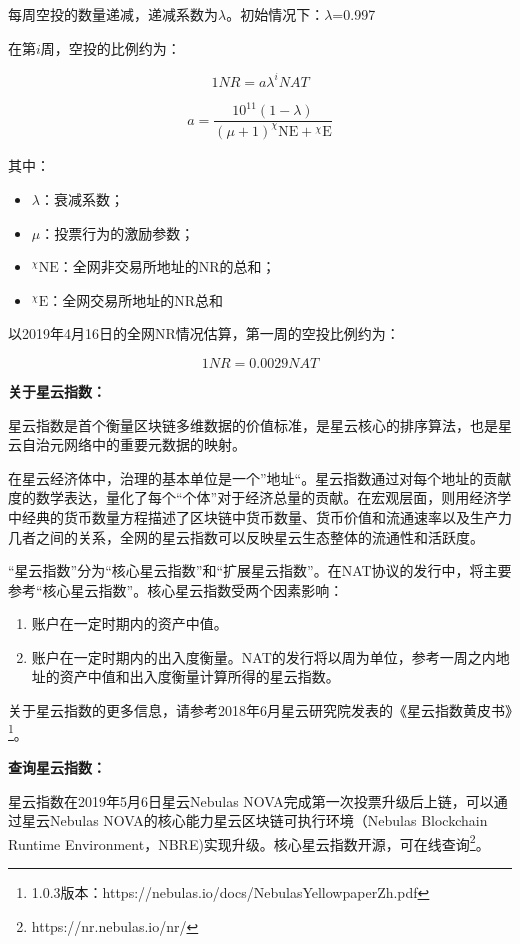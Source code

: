 每周空投的数量递减，递减系数为$\lambda$。初始情况下：$\lambda$=0.997

在第$i$周，空投的比例约为：

$$1 NR = a\lambda^{i} NAT$$

$$a=\frac{10^{11}(1-\lambda)}{{(\mu +1)_{}^{\chi}\textrm{NE}}+{_{}^{\chi}\textrm{E}}}$$    

其中：
\begin{itemize}
	\item $\lambda$：衰减系数；
	\item $\mu$：投票行为的激励参数；
	\item $_{}^{\chi}\textrm{NE}$：全网非交易所地址的NR的总和；
	\item $_{}^{\chi}\textrm{E}$：全网交易所地址的NR总和
\end{itemize}

以2019年4月16日的全网NR情况估算，第一周的空投比例约为：

$$1 NR = 0.0029 NAT$$

\textbf{关于星云指数：}
	
星云指数是首个衡量区块链多维数据的价值标准，是星云核心的排序算法，也是星云自治元网络中的重要元数据的映射。

在星云经济体中，治理的基本单位是一个”地址“。星云指数通过对每个地址的贡献度的数学表达，量化了每个“个体”对于经济总量的贡献。在宏观层面，则用经济学中经典的货币数量方程描述了区块链中货币数量、货币价值和流通速率以及生产力几者之间的关系，全网的星云指数可以反映星云生态整体的流通性和活跃度。

“星云指数”分为“核心星云指数”和“扩展星云指数”。在NAT协议的发行中，将主要参考“核心星云指数”。核心星云指数受两个因素影响：

\begin{enumerate}
	\item 账户在一定时期内的资产中值。
	\item 账户在一定时期内的出入度衡量。NAT的发行将以周为单位，参考一周之内地址的资产中值和出入度衡量计算所得的星云指数。
\end{enumerate}

关于星云指数的更多信息，请参考2018年6月星云研究院发表的《星云指数黄皮书》\footnote{1.0.3版本：https://nebulas.io/docs/NebulasYellowpaperZh.pdf}。

\textbf{查询星云指数：}

星云指数在2019年5月6日星云Nebulas NOVA完成第一次投票升级后上链，可以通过星云Nebulas NOVA的核心能力星云区块链可执行环境（Nebulas Blockchain Runtime Environment，NBRE)实现升级。核心星云指数开源，可在线查询\footnote{https://nr.nebulas.io/nr/}。


